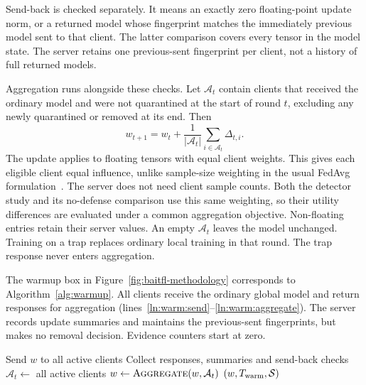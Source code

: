 \documentclass[conference]{IEEEtran}
\makeatletter
\renewcommand{\subsection}{\@startsection{subsection}{2}{\z@}{1.5ex}{0.7ex}{\normalfont\normalsize\itshape}}
\makeatother
\begin{document}
Send-back is checked separately. It means an exactly zero floating-point
update norm, or a returned model whose fingerprint matches the immediately
previous model sent to that client. The latter comparison covers every
tensor in the model state. The server retains one previous-sent fingerprint
per client, not a history of full returned models.

Aggregation runs alongside these checks. Let $\mathcal A_t$ contain clients
that received the ordinary model and were not quarantined at the start of
round $t$, excluding any newly quarantined or removed at its end. Then
\begin{equation}\label{eq:method-aggregation}
 w_{t+1}=w_t+\frac{1}{|\mathcal A_t|}
                 \sum_{i\in\mathcal A_t}\Delta_{t,i}.
\end{equation}
The update applies to floating tensors with equal client weights.
This gives each eligible client equal influence, unlike sample-size
weighting in the usual FedAvg formulation~\cite{mcmahan2017communication}.
The server does not need client sample counts. Both the detector study
and its no-defense comparison use this same weighting, so their utility
differences are evaluated under a common aggregation objective.
Non-floating entries retain their server values. An empty $\mathcal A_t$
leaves the model unchanged. Training on a trap replaces ordinary local
training in that round. The trap response never enters aggregation.

\subsection{Phase I: Warmup}
The warmup box in Figure~\ref{fig:baitfl-methodology} corresponds to
Algorithm~\ref{alg:warmup}. All clients receive the ordinary global model
and return responses for aggregation
(lines~\ref{ln:warm:send}--\ref{ln:warm:aggregate}). The server records update
summaries and maintains the previous-sent fingerprints, but makes no
removal decision. Evidence counters start at zero.

\begin{algorithm}[!htb]
\caption{Phase I: ordinary warmup}\label{alg:warmup}
\begin{algorithmic}[1]\small
{}
  \State Send $w$ to all active clients\label{ln:warm:send}
  \State Collect responses, summaries and send-back checks
  \State $\mathcal A_t\gets$ all active clients
  \State $w\gets\Call{Aggregate}{w,\mathcal A_t}$\label{ln:warm:aggregate}
 \EndFor
 \State \Return $(w,T_{\rm warm},\mathcal S)$
\EndProcedure
\end{algorithmic}
\end{algorithm}
\end{document}

